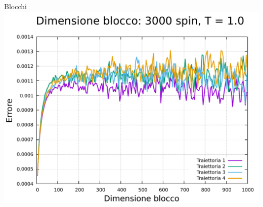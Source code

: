 \begin{frame}
\begin{columns}
\begin{column}{0.33\textwidth}
\begin{block}{Blocchi}
                \centering
                \includegraphics[width=\textwidth]{Immagini/simIsing1D/err_3000_1.0.pdf}
            \end{block}        
        \end{column}
    \end{columns}
\end{frame}